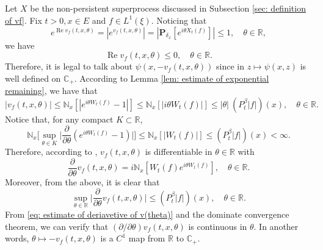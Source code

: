 \documentclass[12pt, a4paper]{amsart}
\theoremstyle{definition}
\numberwithin{equation}{section}
\begin{document}
\subsection{}
    Let $X$ be the non-persistent superprocess discussed in Subsection \ref{sec: definition of vf}.
    Fix $t > 0,x\in E$ and $f\in L^1(\xi)$.
	Noticing that
\[
	e^{\operatorname{Re} v_f(t,x,\theta)} = |e^{v_f(t,x,\theta)}|
	= |\mathbf P_{\delta_x}[e^{i\theta X_t(f)}]| \leq 1,
	\quad \theta\in \mathbb R,
\]
    we have
\begin{equation}
\label{eq: -v has positive real part}
	\operatorname{Re} v_f(t,x,\theta) \leq 0,\quad \theta \in \mathbb R.
\end{equation}
    Therefore, it is legal to talk about $\psi(x,-v_f(t,x,\theta))$ since in $z\mapsto \psi(x,z)$ is well defined on $\mathbb C_+$.
	According to Lemma \ref{lem: estimate of exponential remaining}, we have that
\begin{equation}
\label{eq: upper bound for vf}
	|v_f(t,x,\theta)| \leq \mathbb N_x[|e^{i\theta W_t(f)} - 1|]
	\leq \mathbb N_x[|i\theta W_t(f)|]
	\leq |\theta| ~(P^\beta_t |f|)(x),
	\quad \theta \in \mathbb R.
\end{equation}
	Notice that, for any compact $K \subset \mathbb R$,
\begin{equation}
\label{eq: estimate of deriavetive of v(theta)}
	\mathbb N_x\Big[\sup_{\theta \in K} \Big|\frac{\partial}{\partial \theta} (e^{i\theta W_t(f)} - 1) \Big|\Big]
	\leq \mathbb N_x[|W_t(f)|] \leq (P^\beta_t |f|)(x) < \infty.
\end{equation}
	Therefore, according to \cite[Theorem A.5.2.]{Durrett2010Probability},
	$v_f(t,x,\theta)$ is differentiable in $\theta \in \mathbb R$ with
\[
	\frac{\partial}{\partial \theta} v_f(t,x,\theta)
	= i\mathbb N_x[W_t(f)e^{i\theta W_t(f)}],
	\quad \theta \in \mathbb R.
\]
	Moreover, from the above, it is clear that
\begin{equation}
\label{eq: upper bounded for derivative of v(theta)}
	\sup_{\theta \in \mathbb R}\Big| \frac{\partial}{\partial \theta} v_f(t,x,\theta)\Big|\leq ( P^\beta_t |f|)(x),
    \quad \theta \in \mathbb R.
\end{equation}
    From \eqref{eq: estimate of deriavetive of v(theta)} and the dominate convergence theorem, we can verify that $(\partial/\partial \theta)v_f(t,x,\theta)$ is continuous in $\theta$.
    In another words, $\theta \mapsto -v_f(t,x,\theta)$ is a $C^1$ map from $\mathbb R$ to $\mathbb C_+$.
\end{document}
